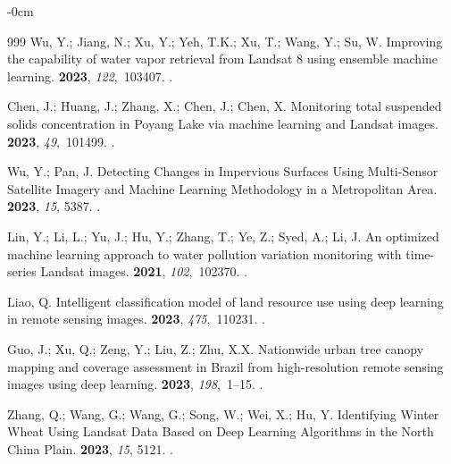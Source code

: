 \documentclass[coasts,article,accept,pdftex,oneauthor]{Definitions/mdpi}
\begin{document}
\begin{adjustwidth}{-\extralength}{0cm}
\begin{thebibliography}{999}
Wu, Y.; Jiang, N.; Xu, Y.; Yeh, T.K.; Xu, T.; Wang, Y.; Su, W.
\newblock Improving the capability of water vapor retrieval from Landsat 8
  using ensemble machine learning.
 {\bf 2023}, {\em 122},~103407.
.

Chen, J.; Huang, J.; Zhang, X.; Chen, J.; Chen, X.
\newblock Monitoring total suspended solids concentration in Poyang Lake via
  machine learning and Landsat images.
 {\bf 2023}, {\em
  49},~101499.
.

Wu, Y.; Pan, J.
\newblock Detecting Changes in Impervious Surfaces Using Multi-Sensor Satellite
  Imagery and Machine Learning Methodology in a Metropolitan Area.
 {\bf 2023}, {\em 15}, 5387.
.

Lin, Y.; Li, L.; Yu, J.; Hu, Y.; Zhang, T.; Ye, Z.; Syed, A.; Li, J.
\newblock An optimized machine learning approach to water pollution variation
  monitoring with time-series Landsat images.
 {\bf 2021}, {\em 102},~102370.
.

Liao, Q.
\newblock Intelligent classification model of land resource use using deep
  learning in remote sensing images.
 {\bf 2023}, {\em 475},~110231.
.

Guo, J.; Xu, Q.; Zeng, Y.; Liu, Z.; Zhu, X.X.
\newblock Nationwide urban tree canopy mapping and coverage assessment in
  Brazil from high-resolution remote sensing images using deep learning.
 {\bf 2023},
  {\em 198},~1--15.
.

Zhang, Q.; Wang, G.; Wang, G.; Song, W.; Wei, X.; Hu, Y.
\newblock Identifying Winter Wheat Using Landsat Data Based on Deep Learning
  Algorithms in the North China Plain.
 {\bf 2023}, {\em 15}, 5121.
.


\end{thebibliography}
\end{adjustwidth}
\end{document}
